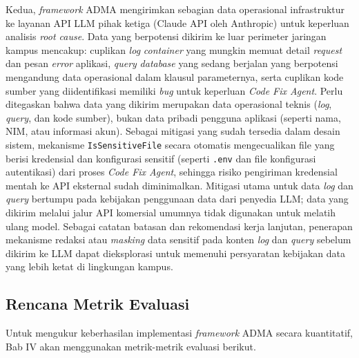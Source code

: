 Kedua, \textit{framework} ADMA mengirimkan sebagian data operasional infrastruktur ke layanan API LLM pihak ketiga (Claude API oleh Anthropic) untuk keperluan analisis \textit{root cause}. Data yang berpotensi dikirim ke luar perimeter jaringan kampus mencakup: cuplikan \textit{log} \textit{container} yang mungkin memuat detail \textit{request} dan pesan \textit{error} aplikasi, \textit{query} \textit{database} yang sedang berjalan yang berpotensi mengandung data operasional dalam klausul parameternya, serta cuplikan kode sumber yang diidentifikasi memiliki \textit{bug} untuk keperluan \textit{Code Fix Agent}. Perlu ditegaskan bahwa data yang dikirim merupakan data operasional teknis (\textit{log}, \textit{query}, dan kode sumber), bukan data pribadi pengguna aplikasi (seperti nama, NIM, atau informasi akun). Sebagai mitigasi yang sudah tersedia dalam desain sistem, mekanisme \texttt{IsSensitiveFile} secara otomatis mengecualikan file yang berisi kredensial dan konfigurasi sensitif (seperti \texttt{.env} dan file konfigurasi autentikasi) dari proses \textit{Code Fix Agent}, sehingga risiko pengiriman kredensial mentah ke API eksternal sudah diminimalkan. Mitigasi utama untuk data \textit{log} dan \textit{query} bertumpu pada kebijakan penggunaan data dari penyedia LLM; data yang dikirim melalui jalur API komersial umumnya tidak digunakan untuk melatih ulang model. Sebagai catatan batasan dan rekomendasi kerja lanjutan, penerapan mekanisme redaksi atau \textit{masking} data sensitif pada konten \textit{log} dan \textit{query} sebelum dikirim ke LLM dapat dieksplorasi untuk memenuhi persyaratan kebijakan data yang lebih ketat di lingkungan kampus.

\subsection{Rencana Metrik Evaluasi}

Untuk mengukur keberhasilan implementasi \textit{framework} ADMA secara kuantitatif, Bab IV akan menggunakan metrik-metrik evaluasi berikut.

